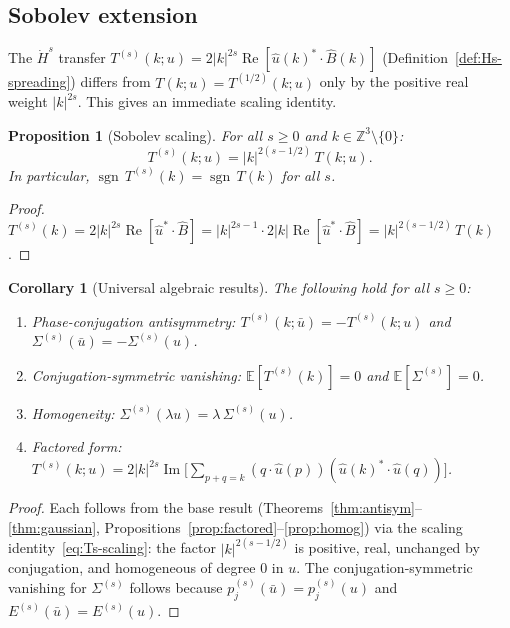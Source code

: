 \documentclass[11pt]{article}
\newtheorem{proposition}[theorem]{Proposition}
\newtheorem{corollary}[theorem]{Corollary}
\theoremstyle{definition}
\newcommand{\Z}{\mathbb{Z}}
\newcommand{\E}{\mathbb{E}}
\newcommand{\Hdot}[1]{\dot{H}^{#1}}
\DeclareMathOperator{\re}{Re}
\DeclareMathOperator{\im}{Im}
\DeclareMathOperator{\sgn}{sgn}
\begin{document}
\subsection{Sobolev extension}

The $\Hdot{s}$ transfer $T^{(s)}(k;u) = 2|k|^{2s}\re[\hat u(k)^*\cdot\hat B(k)]$ (Definition~\ref{def:Hs-spreading}) differs from $T(k;u) = T^{(1/2)}(k;u)$ only by the positive real weight $|k|^{2s}$.  This gives an immediate scaling identity.

\begin{proposition}[Sobolev scaling]
\label{prop:sobolev-scaling}
For all $s\geq 0$ and $k\in\Z^3\setminus\{0\}$:
\begin{equation}\label{eq:Ts-scaling}
T^{(s)}(k;u) = |k|^{2(s-1/2)}\,T(k;u).
\end{equation}
In particular, $\sgn\, T^{(s)}(k) = \sgn\, T(k)$ for all $s$.
\end{proposition}

\begin{proof}
$T^{(s)}(k) = 2|k|^{2s}\re[\hat u^*\cdot\hat B]
= |k|^{2s-1}\cdot 2|k|\re[\hat u^*\cdot\hat B]
= |k|^{2(s-1/2)}\,T(k)$.
\end{proof}

\begin{corollary}[Universal algebraic results]
\label{cor:universal-s}
The following hold for all $s\geq 0$:
\begin{enumerate}[leftmargin=2em,label=(\roman*)]
\item Phase-conjugation antisymmetry:
  $T^{(s)}(k;\bar u) = -T^{(s)}(k;u)$
  and $\Sigma^{(s)}(\bar u) = -\Sigma^{(s)}(u)$.
\item Conjugation-symmetric vanishing:
  $\E[T^{(s)}(k)]=0$ and $\E[\Sigma^{(s)}]=0$.
\item Homogeneity: $\Sigma^{(s)}(\lambda u)=\lambda\,\Sigma^{(s)}(u)$.
\item Factored form:
  $T^{(s)}(k;u) = 2|k|^{2s}\im\bigl[\sum_{p+q=k}
  (q\cdot\hat u(p))(\hat u(k)^*\cdot\hat u(q))\bigr]$.
\end{enumerate}
\end{corollary}

\begin{proof}
Each follows from the base result
(Theorems~\ref{thm:antisym}--\ref{thm:gaussian},
Propositions~\ref{prop:factored}--\ref{prop:homog})
via the scaling identity~\eqref{eq:Ts-scaling}:
the factor $|k|^{2(s-1/2)}$ is positive, real,
unchanged by conjugation, and homogeneous of
degree $0$ in $u$.  The conjugation-symmetric
vanishing for $\Sigma^{(s)}$ follows because
$p_j^{(s)}(\bar u)=p_j^{(s)}(u)$ and
$E^{(s)}(\bar u)=E^{(s)}(u)$.
\end{proof}
\end{document}
